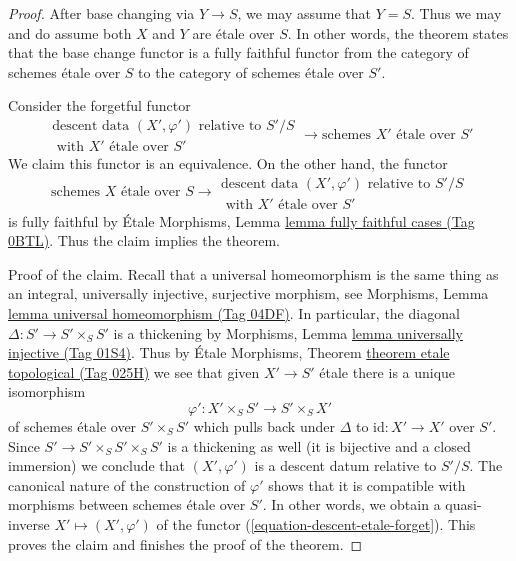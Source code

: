 \documentclass{amsart}
\theoremstyle{plain}
\theoremstyle{definition}
\theoremstyle{remark}
\numberwithin{equation}{subsection}
\begin{document}
\begin{proof}
After base changing via $Y \to S$, we may assume that $Y = S$.
Thus we may and do assume both $X$ and $Y$ are \'etale over $S$.
In other words, the theorem states that the base change functor
is a fully faithful functor from the category of schemes \'etale
over $S$ to the category of schemes \'etale over $S'$.

\medskip\noindent
Consider the forgetful functor
\begin{equation}
\label{equation-descent-etale-forget}
\begin{matrix}
\text{descent data }(X', \varphi')\text{ relative to }S'/S \\
\text{ with }X'\text{ \'etale over }S'
\end{matrix}
\longrightarrow
\text{schemes }X'\text{ \'etale over }S'
\end{equation}
We claim this functor is an equivalence. On the other hand, the
functor
\begin{equation}
\label{equation-descent-etale}
\text{schemes }X\text{ \'etale over }S \longrightarrow
\begin{matrix}
\text{descent data }(X', \varphi')\text{ relative to }S'/S \\
\text{ with }X'\text{ \'etale over }S'
\end{matrix}
\end{equation}
is fully faithful by \'Etale Morphisms, Lemma
\href{https://stacks.math.columbia.edu/tag/0BTL}{lemma fully faithful cases (Tag 0BTL)}.
Thus the claim implies the theorem.

\medskip\noindent
Proof of the claim.
Recall that a universal homeomorphism is the same thing as an
integral, universally injective, surjective morphism, see
Morphisms, Lemma \href{https://stacks.math.columbia.edu/tag/04DF}{lemma universal homeomorphism (Tag 04DF)}.
In particular, the diagonal $\Delta : S' \to S' \times_S S'$ is a thickening
by Morphisms, Lemma \href{https://stacks.math.columbia.edu/tag/01S4}{lemma universally injective (Tag 01S4)}.
Thus by \'Etale Morphisms, Theorem
\href{https://stacks.math.columbia.edu/tag/025H}{theorem etale topological (Tag 025H)}
we see that given $X' \to S'$ \'etale there is a unique isomorphism
$$
\varphi' : X' \times_S S' \to S' \times_S X'
$$
of schemes \'etale over $S' \times_S S'$ which pulls back under
$\Delta$ to $\text{id} : X' \to X'$ over $S'$.
Since $S' \to S' \times_S S' \times_S S'$
is a thickening as well (it is bijective and a closed immersion)
we conclude that $(X', \varphi')$ is a descent datum relative to $S'/S$.
The canonical nature of the construction of $\varphi'$ shows
that it is compatible with morphisms between schemes \'etale over $S'$.
In other words, we obtain a quasi-inverse
$X' \mapsto (X', \varphi')$ of the functor
(\ref{equation-descent-etale-forget}). This proves the claim and
finishes the proof of the theorem.
\end{proof}
\end{document}
